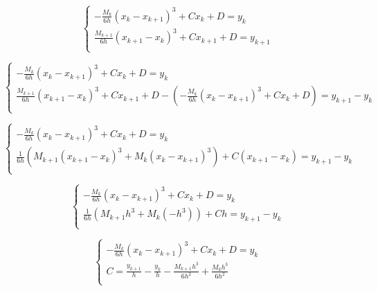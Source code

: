 \documentclass{article}
\begin{document}
\begin{enumerate}
\begin{enumerate}
    \begin{equation*}
      \left\{
      \begin{array}{l}
        - \frac{M_k}{6h} (x_k - x_{k + 1})^3 + Cx_k + D = y_k \\
        \frac{M_{k + 1}}{6h} (x_{k + 1} - x_k)^3 + Cx_{k + 1} + D =
        y_{k + 1}\\
      \end{array}
      \right.
    \end{equation*}

    \begin{equation*}
      \left\{
      \begin{array}{l}
        - \frac{M_k}{6h} (x_k - x_{k + 1})^3 + Cx_k + D = y_k \\
        \frac{M_{k + 1}}{6h} (x_{k + 1} - x_k)^3 + Cx_{k + 1} + D -
        \left (- \frac{M_k}{6h} (x_k - x_{k + 1})^3 + Cx_k + D \right)
        = y_{k + 1} - y_k\\
      \end{array}
      \right.
    \end{equation*}

    \begin{equation*}
      \left\{
      \begin{array}{l}
        - \frac{M_k}{6h} (x_k - x_{k + 1})^3 + Cx_k + D = y_k \\
        \frac{1}{6h} (M_{k + 1}(x_{k + 1} - x_k)^3 + M_k (x_k - x_{k +
          1})^3) + C (x_{k + 1} - x_k) = y_{k + 1} - y_k\\
      \end{array}
      \right.
    \end{equation*}

    \begin{equation*}
      \left\{
      \begin{array}{l}
        - \frac{M_k}{6h} (x_k - x_{k + 1})^3 + Cx_k + D = y_k \\
        \frac{1}{6h} (M_{k + 1} h^3 + M_k (-h^3)) + C h = y_{k + 1} - y_k\\
      \end{array}
      \right.
    \end{equation*}

    \begin{equation*}
      \left\{
      \begin{array}{l}
        - \frac{M_k}{6h} (x_k - x_{k + 1})^3 + Cx_k + D = y_k \\
        C = \frac{y_{k + 1}}{h} - \frac{y_k}{h} - \frac{M_{k
          + 1} h^3 }{6 h^2} + \frac{M_k h^3}{6h^2}\\
      \end{array}
      \right.
    \end{equation*}


\end{enumerate}
\end{enumerate}
\end{document}
